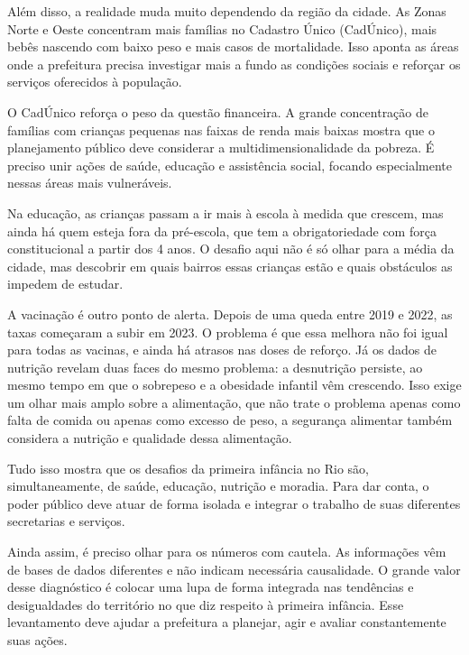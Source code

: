 Além disso, a realidade muda muito dependendo da região da cidade. As Zonas Norte e Oeste concentram mais famílias no Cadastro Único (CadÚnico), mais bebês nascendo com baixo peso e mais casos de mortalidade. Isso aponta as áreas onde a prefeitura precisa investigar mais a fundo as condições sociais e reforçar os serviços oferecidos à população.

O CadÚnico reforça o peso da questão financeira. A grande concentração de famílias com crianças pequenas nas faixas de renda mais baixas mostra que o planejamento público deve considerar a multidimensionalidade da pobreza. É preciso unir ações de saúde, educação e assistência social, focando especialmente nessas áreas mais vulneráveis.

Na educação, as crianças passam a ir mais à escola à medida que crescem, mas ainda há quem esteja fora da pré-escola, que tem a obrigatoriedade com força constitucional a partir dos 4 anos. O desafio aqui não é só olhar para a média da cidade, mas descobrir em quais bairros essas crianças estão e quais obstáculos as impedem de estudar.

A vacinação é outro ponto de alerta. Depois de uma queda entre 2019 e 2022, as taxas começaram a subir em 2023. O problema é que essa melhora não foi igual para todas as vacinas, e ainda há atrasos nas doses de reforço. Já os dados de nutrição revelam duas faces do mesmo problema: a desnutrição persiste, ao mesmo tempo em que o sobrepeso e a obesidade infantil vêm crescendo. Isso exige um olhar mais amplo sobre a alimentação, que não trate o problema apenas como falta de comida ou apenas como excesso de peso, a segurança alimentar também considera a nutrição e qualidade dessa alimentação.

Tudo isso mostra que os desafios da primeira infância no Rio são, simultaneamente, de saúde, educação, nutrição e moradia. Para dar conta, o poder público deve atuar de forma isolada e integrar o trabalho de suas diferentes secretarias e serviços.

Ainda assim, é preciso olhar para os números com cautela. As informações vêm de bases de dados diferentes e não indicam necessária causalidade.  O grande valor desse diagnóstico é colocar uma lupa de forma integrada nas tendências e desigualdades do território no que diz respeito à primeira infância. Esse levantamento deve ajudar a prefeitura a planejar, agir e avaliar constantemente suas ações.
